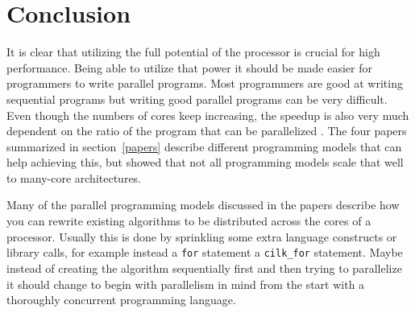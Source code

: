 \section{Conclusion}


It is clear that utilizing the full potential of the processor is crucial for
high performance. Being able to utilize that power it should be made easier for
programmers to write parallel programs. Most programmers are good at writing
sequential programs but writing good parallel programs can be very difficult.
Even though the numbers of cores keep increasing, the speedup is also very much
dependent on the ratio of the program that can be parallelized
\cite{hennessy2007computer}. The four papers summarized in section~\ref{papers}
describe different programming models that can help achieving this, but
\cite{CaoPerformanceAnalysis} showed that not all programming models scale that
well to many-core architectures.

Many of the parallel programming models discussed in the papers describe how
you can rewrite existing algorithms to be distributed across the cores of a
processor. Usually this is done by sprinkling some extra language constructs or
library calls, for example instead a \texttt{for} statement a
\texttt{cilk\_for} statement. Maybe instead of creating the algorithm
sequentially first and then trying to parallelize it should change to begin
with parallelism in mind from the start with a thoroughly concurrent
programming language.
